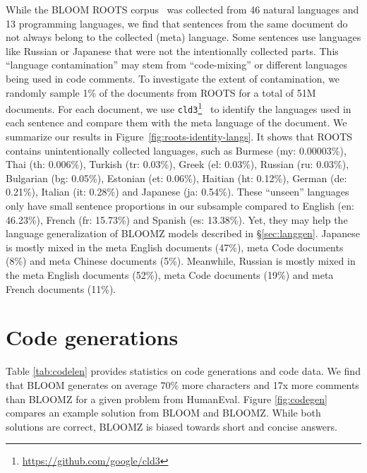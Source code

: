 \documentclass[11pt]{article}
\begin{document}
While the BLOOM ROOTS corpus~\cite{laurencconbigscience} was collected from 46 natural languages and 13 programming languages, we find that sentences from the same document do not always belong to the collected (meta) language. Some sentences use languages like Russian or Japanese that were not the intentionally collected parts. This ``language contamination'' may stem from ``code-mixing'' or different languages being used in code comments. To investigate the extent of contamination, we randomly sample 1\% of the documents from ROOTS for a total of 51M documents. For each document, we use \texttt{cld3}\footnote{\url{https://github.com/google/cld3}}~\cite{xue2020mt5} to identify the languages used in each sentence and compare them with the meta language of the document. We summarize our results in Figure~\ref{fig:roots-identity-langs}. It shows that ROOTS contains unintentionally collected languages, such as Burmese (my: 0.00003\%), Thai (th: 0.006\%), Turkish (tr: 0.03\%), Greek (el: 0.03\%), Russian (ru: 0.03\%), Bulgarian (bg: 0.05\%),  Estonian (et: 0.06\%), Haitian (ht: 0.12\%), German (de: 0.21\%), Italian (it: 0.28\%) and Japanese (ja: 0.54\%). These ``unseen'' languages only have small sentence proportions in our subsample compared to English (en: 46.23\%), French (fr: 15.73\%) and Spanish (es: 13.38\%). Yet, they may help the language generalization of BLOOMZ models described in \S\ref{sec:langgen}. Japanese is mostly mixed in the meta English documents (47\%), meta Code documents (8\%) and meta Chinese documents (5\%). Meanwhile, Russian is mostly mixed in the meta English documents (52\%), meta Code documents (19\%) and meta French documents (11\%).

\FloatBarrier

\section{Code generations}
\label{sec:codegen}

Table \ref{tab:codelen} provides statistics on code generations and code data. We find that BLOOM generates on average 70\% more characters and 17x more comments than BLOOMZ for a given problem from HumanEval. Figure \ref{fig:codegen} compares an example solution from BLOOM and BLOOMZ. While both solutions are correct, BLOOMZ is biased towards short and concise answers.

\begin{figure*}[htbp]
    \centering
    \qquad
    {}
    \caption{Code generations of BLOOM and BLOOMZ on HumanEval. The model is prompted to generate after the final $"""$. The generation is stopped after an end-of-sequence token or a return statement followed by a newline.}
    \label{fig:codegen}
\end{figure*}
\end{document}
